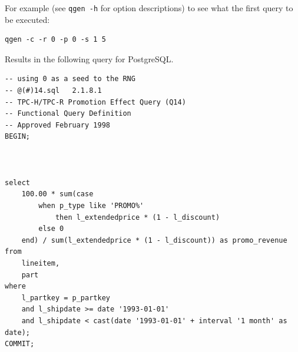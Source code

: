\documentclass{article}
\begin{document}
For example (see \texttt{qgen -h} for option descriptions) to see what the
first query to be executed:

\lstset{language=sh}
\begin{lstlisting}
qgen -c -r 0 -p 0 -s 1 5
\end{lstlisting}

Results in the following query for PostgreSQL.

\lstset{language=sql}
\begin{lstlisting}
-- using 0 as a seed to the RNG
-- @(#)14.sql	2.1.8.1
-- TPC-H/TPC-R Promotion Effect Query (Q14)
-- Functional Query Definition
-- Approved February 1998
BEGIN;



select
	100.00 * sum(case
		when p_type like 'PROMO%'
			then l_extendedprice * (1 - l_discount)
		else 0
	end) / sum(l_extendedprice * (1 - l_discount)) as promo_revenue
from
	lineitem,
	part
where
	l_partkey = p_partkey
	and l_shipdate >= date '1993-01-01'
	and l_shipdate < cast(date '1993-01-01' + interval '1 month' as date);
COMMIT;
\end{lstlisting}
\end{document}
